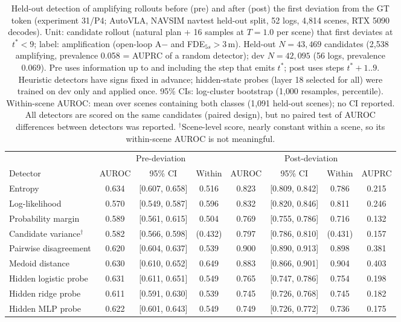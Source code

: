 \begin{table}[t]
\centering
\small
\setlength{\tabcolsep}{4pt}
\caption{Held-out detection of amplifying rollouts before (pre) and after (post) the first deviation from the GT token (experiment 31/P4; AutoVLA, NAVSIM navtest held-out split, 52 logs, 4{,}814 scenes, RTX 5090 decodes). Unit: candidate rollout (natural plan + 16 samples at $T{=}1.0$ per scene) that first deviates at $t^*<9$; label: amplification (open-loop A$-$ and FDE$_{5s}>3$\,m). Held-out $N=43,469$ candidates (2,538 amplifying, prevalence 0.058 = AUPRC of a random detector); dev $N=42,095$ (56 logs, prevalence 0.069). Pre uses information up to and including the step that emits $t^*$; post uses steps $t^*{+}1..9$. Heuristic detectors have signs fixed in advance; hidden-state probes (layer 18 selected for all) were trained on dev only and applied once. 95\% CIs: log-cluster bootstrap (1{,}000 resamples, percentile). Within-scene AUROC: mean over scenes containing both classes (1,091 held-out scenes); no CI reported. All detectors are scored on the same candidates (paired design), but no paired test of AUROC differences between detectors was reported. $^\dagger$Scene-level score, nearly constant within a scene, so its within-scene AUROC is not meaningful.}
\label{tab:detection}
\begin{tabular}{lccccccc}
\toprule
 & \multicolumn{3}{c}{Pre-deviation} & \multicolumn{4}{c}{Post-deviation} \\
\cmidrule(lr){2-4}\cmidrule(lr){5-8}
Detector & AUROC & 95\% CI & Within & AUROC & 95\% CI & Within & AUPRC \\
\midrule
Entropy & 0.634 & [0.607, 0.658] & 0.516 & 0.823 & [0.809, 0.842] & 0.786 & 0.215 \\
Log-likelihood & 0.570 & [0.549, 0.587] & 0.596 & 0.832 & [0.820, 0.846] & 0.811 & 0.246 \\
Probability margin & 0.589 & [0.561, 0.615] & 0.504 & 0.769 & [0.755, 0.786] & 0.716 & 0.132 \\
Candidate variance$^\dagger$ & 0.582 & [0.566, 0.598] & (0.432) & 0.797 & [0.786, 0.810] & (0.431) & 0.157 \\
Pairwise disagreement & 0.620 & [0.604, 0.637] & 0.539 & 0.900 & [0.890, 0.913] & 0.898 & 0.381 \\
Medoid distance & 0.630 & [0.610, 0.652] & 0.649 & 0.883 & [0.866, 0.901] & 0.904 & 0.403 \\
\midrule
Hidden logistic probe & 0.631 & [0.611, 0.651] & 0.549 & 0.765 & [0.747, 0.786] & 0.754 & 0.198 \\
Hidden ridge probe & 0.611 & [0.591, 0.630] & 0.539 & 0.745 & [0.726, 0.768] & 0.745 & 0.182 \\
Hidden MLP probe & 0.622 & [0.601, 0.643] & 0.549 & 0.749 & [0.726, 0.772] & 0.736 & 0.175 \\
\bottomrule
\end{tabular}
\end{table}
